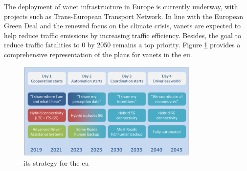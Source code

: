 The deployment of \gls{vanet} infrastructure in Europe is currently underway, with projects such as Trans-European Transport Network. In line with the European Green Deal and the renewed focus on the climate crisis, \glspl{vanet} are expected to help reduce traffic emissions by increasing traffic efficiency. Besides, the goal to reduce traffic fatalities to 0 by 2050 remains a top priority\cite{lu_pan-european_2019}. Figure \ref{fig:EU_strat} provides a comprehensive representation of the plans for \glspl{vanet} in the \gls{eu}.

\begin{figure}[htbp]
    \centering
    \includegraphics[width=0.8\textwidth]{Chapters/Figures/VANETs/ITS_strategy_EU.png}
   	\caption{\gls{its} strategy for the \gls{eu}~\cite{lu_pan-european_2019}}
   	\label{fig:EU_strat}
\end{figure}




